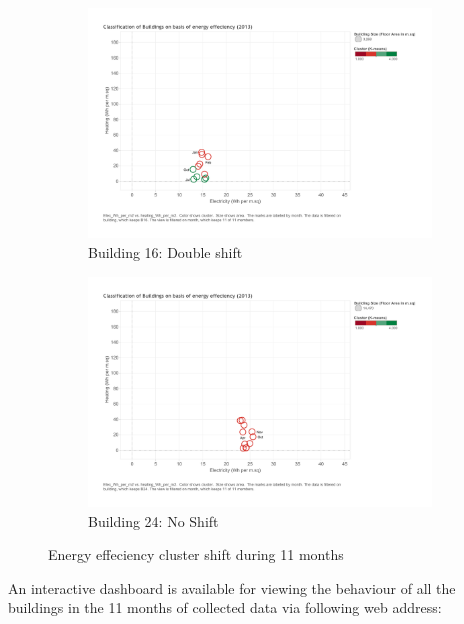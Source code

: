 \begin{figure}[H]
        \begin{subfigure}[b]{0.45\textwidth}
                \includegraphics[width=\textwidth]{images/kmeans_B16_2c.pdf}
                \caption{Building 16: Double shift}
                \label{fig:dbl}
        \end{subfigure}
        \begin{subfigure}[b]{0.45\textwidth}
                        \includegraphics[width=\textwidth]{images/kmeans_b24_no.pdf}
                        \caption{Building 24: No Shift}
                        \label{fig:single}
       \end{subfigure}
     \caption{Energy effeciency cluster shift during 11 months}\label{fig:clustershift}
\end{figure}

An interactive dashboard is available for viewing the behaviour of all the buildings in the 11 months of collected data via following web address:


